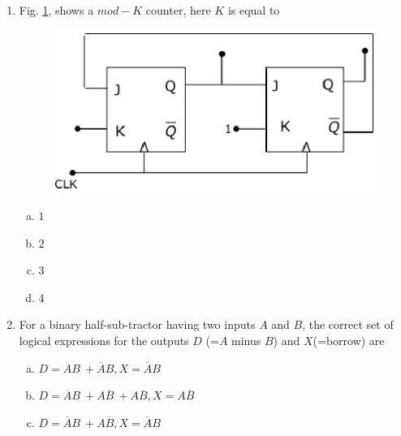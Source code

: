 \documentclass[journal,12pt,twocolumn]{IEEEtran}
\begin{document}
\begin{enumerate}
\item Fig. \ref{fig:7}, shows a $mod-K$ counter, here $K$ is equal to

\begin{figure}

\centering

\includegraphics[width=\columnwidth]{./figs/7.eps}

\caption{}

\label{fig:7}

\end{figure} 


\begin{enumerate}[(a)]
 
\item $
1
$

\item $
2
$

\item $
3
$

\item $
4
$


\end{enumerate}

\item For a binary half-sub-tractor having two inputs $A$ and $B$, the correct set of logical expressions for the outputs $D$ (=$A$ minus $B$) and $X$(=borrow) are

\begin{enumerate}[(a)]
 
\item $
D = AB \ + \overline{A}B, X  =  \overline{A}B 
$

\item $
D = \overline{A}B \ +  A\overline{B} \ +  A \overline{B}, X  =  A\overline{B} 
$

\item $
D = \overline{A}B \ +  A \overline{B}, X  =  \overline{A}B 
$


\end{enumerate}
\end{enumerate}
\end{document}
